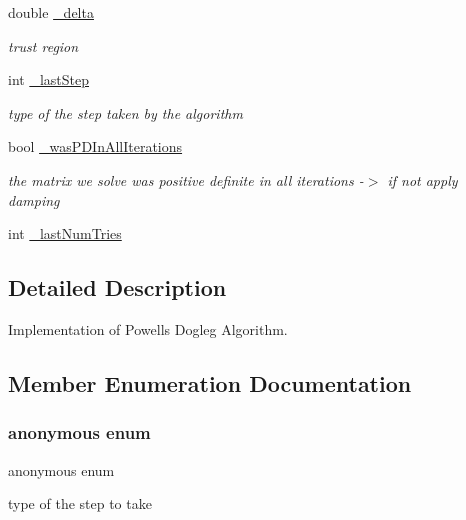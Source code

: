 \begin{DoxyCompactItemize}
double \mbox{\hyperlink{classg2o_1_1_optimization_algorithm_dogleg_a3484b12efddd9fc0051100634effecd6}{\+\_\+delta}}
\begin{DoxyCompactList}\small\item\em trust region \end{DoxyCompactList}\item 
int \mbox{\hyperlink{classg2o_1_1_optimization_algorithm_dogleg_a3bf898af0087c0ed8287d0cd13e4c943}{\+\_\+last\+Step}}
\begin{DoxyCompactList}\small\item\em type of the step taken by the algorithm \end{DoxyCompactList}\item 
bool \mbox{\hyperlink{classg2o_1_1_optimization_algorithm_dogleg_af921ebbebaf059f73e410fc751616ec2}{\+\_\+was\+P\+D\+In\+All\+Iterations}}
\begin{DoxyCompactList}\small\item\em the matrix we solve was positive definite in all iterations -\/$>$ if not apply damping \end{DoxyCompactList}\item 
int \mbox{\hyperlink{classg2o_1_1_optimization_algorithm_dogleg_aeab37f3f587dc8b37b5a42d36fd8217c}{\+\_\+last\+Num\+Tries}}
\end{DoxyCompactItemize}


\subsection{Detailed Description}
Implementation of Powell\textquotesingle{}s Dogleg Algorithm. 

\subsection{Member Enumeration Documentation}
\mbox{\label{classg2o_1_1_optimization_algorithm_dogleg_a431b0b88011685955381bdeb68bb5390}} 
\subsubsection{\texorpdfstring{anonymous enum}{anonymous enum}}
{\footnotesize\ttfamily anonymous enum}



type of the step to take 

